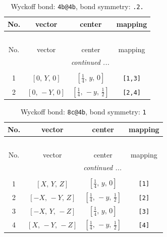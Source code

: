 \documentclass[fleqn,8pt]{jsarticle}
\begin{document}
\renewcommand{\arraystretch}{1.2}
\begin{longtable}{cccc}
\caption{Wyckoff bond: {\tt 4b@4b}, bond symmetry: {\tt .2.}}
 \\
 \hline \hline
No. & vector & center & mapping \\ \hline \endfirsthead

\multicolumn{3}{l}{\tablename\ \thetable{}} \\
 \hline \hline
No. & vector & center & mapping \\ \hline \endhead

 \hline \hline
\multicolumn{3}{r}{\footnotesize\it continued ...} \\ \endfoot

 \hline \hline
\multicolumn{3}{r}{} \\ \endlastfoot

1 & $\left[ 0,\, Y,\, 0 \right]$ & $\left[ \frac{1}{4},\, y,\, 0 \right]$ & {\tt [1,3]} \\ \hline
2 & $\left[ 0,\, - Y,\, 0 \right]$ & $\left[ \frac{1}{4},\, - y,\, \frac{1}{2} \right]$ & {\tt [2,4]} \\
\end{longtable}
\renewcommand{\arraystretch}{1.2}
\begin{longtable}{cccc}
\caption{Wyckoff bond: {\tt 8c@4b}, bond symmetry: {\tt 1}}
 \\
 \hline \hline
No. & vector & center & mapping \\ \hline \endfirsthead

\multicolumn{3}{l}{\tablename\ \thetable{}} \\
 \hline \hline
No. & vector & center & mapping \\ \hline \endhead

 \hline \hline
\multicolumn{3}{r}{\footnotesize\it continued ...} \\ \endfoot

 \hline \hline
\multicolumn{3}{r}{} \\ \endlastfoot

1 & $\left[ X,\, Y,\, Z \right]$ & $\left[ \frac{1}{4},\, y,\, 0 \right]$ & {\tt [1]} \\ \hline
2 & $\left[ - X,\, - Y,\, Z \right]$ & $\left[ \frac{1}{4},\, - y,\, \frac{1}{2} \right]$ & {\tt [2]} \\ \hline
3 & $\left[ - X,\, Y,\, - Z \right]$ & $\left[ \frac{1}{4},\, y,\, 0 \right]$ & {\tt [3]} \\ \hline
4 & $\left[ X,\, - Y,\, - Z \right]$ & $\left[ \frac{1}{4},\, - y,\, \frac{1}{2} \right]$ & {\tt [4]} \\
\end{longtable}
\end{document}
